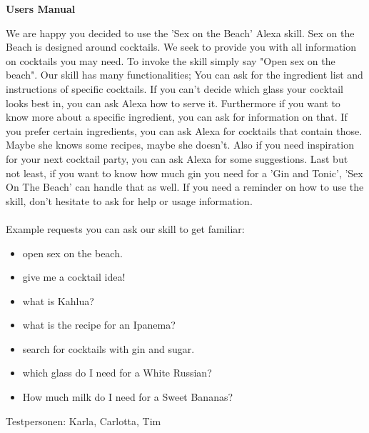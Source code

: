 \documentclass[12pt,letterpaper]{article}
\begin{document}
\begin{adjustwidth}{1cm}{1cm}
\textbf{Users Manual} 

We are happy you decided to use the 'Sex on the Beach' Alexa skill. Sex on the Beach is designed around cocktails. We seek to provide you with all information on cocktails you may need. To invoke the skill simply say "Open sex on the beach".
Our skill has many functionalities; You can ask for the ingredient list and instructions of specific cocktails. If you can’t decide which glass your cocktail looks best in, you can ask Alexa how to serve it. Furthermore if you want to know more about a specific ingredient, you can ask for information on that. If you prefer certain ingredients, you can ask Alexa for cocktails that contain those. Maybe she knows some recipes, maybe she doesn't. Also if you need inspiration for your next cocktail party, you can ask Alexa for some suggestions. Last but not least, if you want to know how much gin you need for a 'Gin and Tonic', 'Sex On The Beach' can handle that as well.
If you need a reminder on how to use the skill, don't hesitate to ask for help or usage information. \\ \\
Example requests you can ask our skill to get familiar:
\begin{itemize}

\item open sex on the beach.

\item give me a cocktail idea!

\item what is Kahlua?

\item what is the recipe for an Ipanema?

\item search for cocktails with gin and sugar.

\item which glass do I need for a White Russian?

\item How much milk do I need for a Sweet Bananas?
\end{itemize}

\end{adjustwidth}

Testpersonen:
    Karla, Carlotta, Tim
\end{document}
